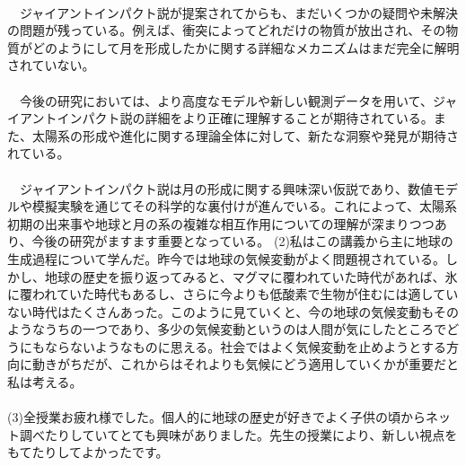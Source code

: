 \documentclass[a4paper,10.5pt]{ltjsarticle}
\begin{document}
\\
　ジャイアントインパクト説が提案されてからも、まだいくつかの疑問や未解決の問題が残っている。例えば、衝突によってどれだけの物質が放出され、その物質がどのようにして月を形成したかに関する詳細なメカニズムはまだ完全に解明されていない。\\
\\
　今後の研究においては、より高度なモデルや新しい観測データを用いて、ジャイアントインパクト説の詳細をより正確に理解することが期待されている。また、太陽系の形成や進化に関する理論全体に対して、新たな洞察や発見が期待されている。\\
\\
　ジャイアントインパクト説は月の形成に関する興味深い仮説であり、数値モデルや模擬実験を通じてその科学的な裏付けが進んでいる。これによって、太陽系初期の出来事や地球と月の系の複雑な相互作用についての理解が深まりつつあり、今後の研究がますます重要となっている。
\clearpage
(2)私はこの講義から主に地球の生成過程について学んだ。昨今では地球の気候変動がよく問題視されている。しかし、地球の歴史を振り返ってみると、マグマに覆われていた時代があれば、氷に覆われていた時代もあるし、さらに今よりも低酸素で生物が住むには適していない時代はたくさんあった。このように見ていくと、今の地球の気候変動もそのようなうちの一つであり、多少の気候変動というのは人間が気にしたところでどうにもならないようなものに思える。社会ではよく気候変動を止めようとする方向に動きがちだが、これからはそれよりも気候にどう適用していくかが重要だと私は考える。\\
\\
(3)全授業お疲れ様でした。個人的に地球の歴史が好きでよく子供の頃からネット調べたりしていてとても興味がありました。先生の授業により、新しい視点をもてたりしてよかったです。
\end{document}
